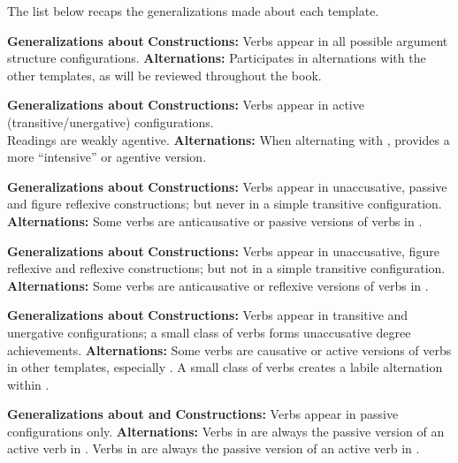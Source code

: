 The list below recaps the generalizations made about each template.

\pex \textbf{Generalizations about {\tkal}}
	\a \textbf{Constructions:} Verbs appear in all possible argument structure configurations.
	\a \textbf{Alternations:} Participates in alternations with the other templates, as will be reviewed throughout the book.
\xe

\pex \textbf{Generalizations about {\tpie}}
	\a \textbf{Constructions:} Verbs appear in active (transitive/unergative) configurations.\\
		Readings are weakly agentive.
	\a \textbf{Alternations:} When alternating with {\tkal}, provides a more ``intensive'' or agentive version.
\xe

\pex \textbf{Generalizations about {\tnif}}
	\a \textbf{Constructions:} Verbs appear in unaccusative, passive and figure reflexive constructions; but never in a simple transitive configuration.
	\a \textbf{Alternations:} Some verbs are anticausative or passive versions of verbs in {\tkal}.
\xe

\pex \textbf{Generalizations about {\thit}}
	\a \textbf{Constructions:} Verbs appear in unaccusative, figure reflexive and reflexive constructions; but not in a simple transitive configuration.
	\a \textbf{Alternations:} Some verbs are anticausative or reflexive versions of verbs in {\tpie}.
\xe

\pex \textbf{Generalizations about {\thif}}
	\a \textbf{Constructions:} Verbs appear in transitive and unergative configurations; a small class of verbs forms unaccusative degree achievements.
	\a \textbf{Alternations:} Some verbs are causative or active versions of verbs in other templates, especially {\tkal}. A small class of verbs creates a labile alternation within {\thif}.
\xe

\pex \textbf{Generalizations about {\tpua} and {\thuf}}
	\a \textbf{Constructions:} Verbs appear in passive configurations only.
	\a \textbf{Alternations:} Verbs in {\tpua} are always the passive version of an active verb in {\tpie}. Verbs in {\thuf} are always the passive version of an active verb in {\thif}.
\xe

